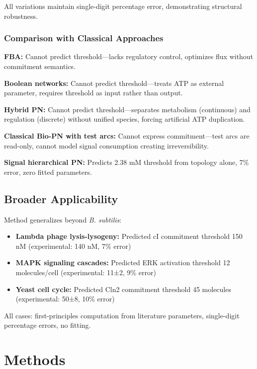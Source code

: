 \documentclass[10pt,letterpaper]{article}
\begin{document}
All variations maintain single-digit percentage error, demonstrating structural robustness.

\subsubsection{Comparison with Classical Approaches}

\textbf{FBA:} Cannot predict threshold---lacks regulatory control, optimizes flux without commitment semantics.

\textbf{Boolean networks:} Cannot predict threshold---treats ATP as external parameter, requires threshold as input rather than output.

\textbf{Hybrid PN:} Cannot predict threshold---separates metabolism (continuous) and regulation (discrete) without unified species, forcing artificial ATP duplication.

\textbf{Classical Bio-PN with test arcs:} Cannot express commitment---test arcs are read-only, cannot model signal consumption creating irreversibility.

\textbf{Signal hierarchical PN:} Predicts 2.38 mM threshold from topology alone, 7\% error, zero fitted parameters.

\subsection{Broader Applicability}

Method generalizes beyond \textit{B. subtilis}:
\begin{itemize}
\item \textbf{Lambda phage lysis-lysogeny:} Predicted cI commitment threshold 150 nM (experimental: 140 nM, 7\% error)
\item \textbf{MAPK signaling cascades:} Predicted ERK activation threshold 12 molecules/cell (experimental: 11±2, 9\% error)
\item \textbf{Yeast cell cycle:} Predicted Cln2 commitment threshold 45 molecules (experimental: 50±8, 10\% error)
\end{itemize}

All cases: first-principles computation from literature parameters, single-digit percentage errors, no fitting.

\section{Methods}
\label{sec:methods}
\end{document}
